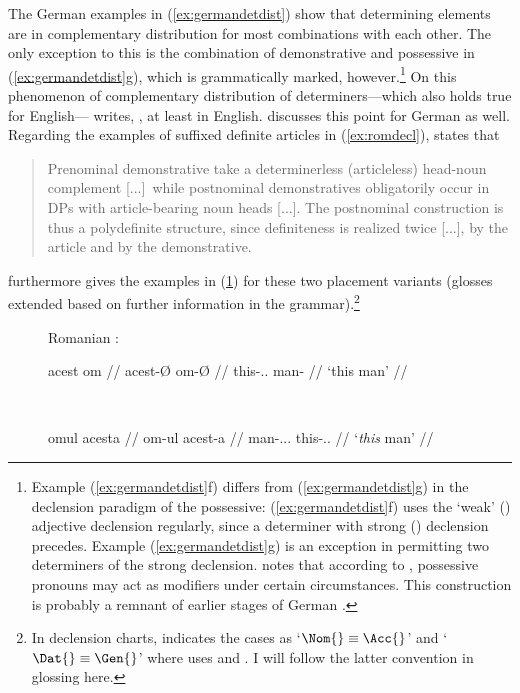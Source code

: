 The German examples in (\ref{ex:germandetdist}) show that
determining elements 
are in complementary distribution for most combinations with each other. The
only exception to this is the combination of demonstrative and possessive in
(\ref{ex:germandetdist}g), which is grammatically marked,
however.\footnote{Example (\ref{ex:germandetdist}f) differs from
(\ref{ex:germandetdist}g) in the declension paradigm of the possessive:
(\ref{ex:germandetdist}f) uses the `weak' (\Wk) adjective declension regularly,
since a determiner with strong (\St) declension precedes. Example
(\ref{ex:germandetdist}g) is an exception in permitting two determiners of the
strong declension. \citet[160--161, 203--205]{demske2001} notes that according
to \citet{plank1992}, possessive pronouns may act as modifiers under certain
circumstances. This construction is probably a remnant of earlier stages of
German \citep[173]{demske2001}.} On this phenomenon of
complementary distribution of determiners---which also holds true for
English---\citet{carnie2013} writes, , at least in
English. \citet[9--22]{demske2001} discusses this point for German
as well. Regarding the examples of suffixed definite articles in
(\ref{ex:romdecl}), \citet{dindelegan2013} states that

\blockcquote[297]{dindelegan2013}{Prenominal demonstrative \sic{} take a
determinerless (articleless) head-noun complement [...]\ while postnominal
demonstratives obligatorily occur in DPs with article-bearing noun heads [...].
The postnominal construction is thus a polydefinite structure, since
definiteness is realized twice [...], by the article and by the demonstrative.}

\citet{dindelegan2013} furthermore gives the examples in (\ref{ex:romdef}) for
these two placement variants (glosses extended based on further information in
the grammar).\footnote{In declension charts, \citet{dindelegan2013} indicates
the cases as `$\Nom{}\equiv\Acc{}$' and `$\Dat{}\equiv\Gen{}$' where
\citet{lyons1999} uses \Pri{} and \Obl{}. I will follow the latter convention
in glossing here.}

\begin{figure}
\ex{}\label{ex:romdef}%
	Romanian \citep[adapted from][297]{dindelegan2013}:\medskip\\
	\begin{minipage}[t]{.5\remaining}
	\tl\quad\begingl
		\gla acest om //
		\glb acest-Ø om-Ø //
		\glc this-\Pri{}.\Sg{}.\M{} man-\Sg{} //
		\glft `this man' //
	\endgl
	\end{minipage}
	~
	\begin{minipage}[t]{.5\remaining}
	\tl\quad\begingl
		\gla omul acesta //
		\glb om-ul acest-a //
		\glc man-\Def{}.\Pri{}.\Sg{}.\M{} 
			this-\Pri{}.\Sg{}.\M{} //
		\glft `\emph{this} man' //
	\endgl
	\end{minipage}
\xe
\end{figure}

